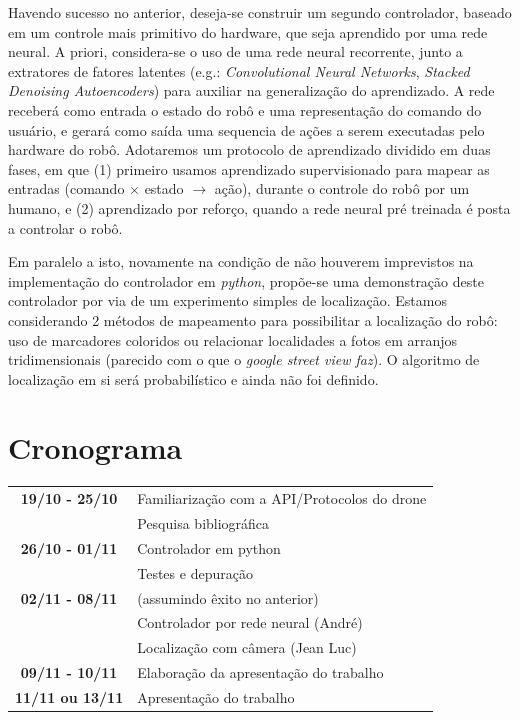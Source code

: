 \documentclass[12pt, a4paper]{article}
\begin{document}
Havendo sucesso no anterior, deseja-se construir um segundo controlador, baseado em um controle mais primitivo do hardware, que seja aprendido por uma rede neural. A priori, considera-se o uso de uma rede neural recorrente, junto a extratores de fatores latentes (e.g.: \emph{Convolutional Neural Networks}, \emph{Stacked Denoising Autoencoders}) para auxiliar na generalização do aprendizado. A rede receberá como entrada o estado do robô e uma representação do comando do usuário, e gerará como saída uma sequencia de ações a serem executadas pelo hardware do robô. Adotaremos um protocolo de aprendizado dividido em duas fases, em que (1) primeiro usamos aprendizado supervisionado para mapear as entradas (comando $\times$ estado $\rightarrow$ ação), durante o controle do robô por um humano, e (2) aprendizado por reforço, quando a rede neural pré treinada é posta a controlar o robô. 

Em paralelo a isto, novamente na condição de não houverem imprevistos na implementação do controlador em \emph{python}, propõe-se uma demonstração deste controlador por via de um experimento simples de localização. Estamos considerando 2 métodos de mapeamento para possibilitar a localização do robô: uso de marcadores coloridos ou relacionar localidades a fotos em arranjos tridimensionais (parecido com o que o \emph{google street view faz}). O algoritmo de localização em si será probabilístico e ainda não foi definido.

\section{Cronograma}

\begin{tabular}{c | p{10cm}}
	\textbf{19/10 - 25/10} 
	& Familiarização com a API/Protocolos do drone\\
	& Pesquisa bibliográfica\\
	\hline	
	\textbf{26/10 - 01/11} 
	& Controlador em python\\
	& Testes e depuração\\
	\hline		
	\textbf{02/11 - 08/11} 
	& (assumindo êxito no anterior)\\
	& Controlador por rede neural (André)\\
	& Localização com câmera (Jean Luc)\\
	\hline		
	\textbf{09/11 - 10/11} 
	& Elaboração da apresentação do trabalho\\	
	\hline		
	\textbf{11/11 ou 13/11}
	& Apresentação do trabalho\\
\end{tabular}
\end{document}
